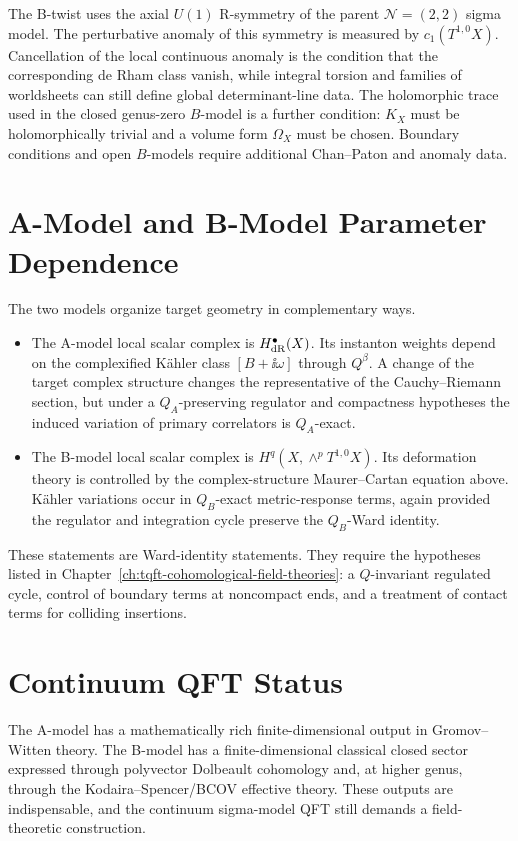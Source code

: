 The B-twist uses the axial \(U(1)\) R-symmetry of the parent
\(\mathcal N=(2,2)\) sigma model.  The perturbative anomaly of this symmetry
is measured by \(c_1(T^{1,0}X)\).  Cancellation of the local continuous
anomaly is the condition that the corresponding de Rham class vanish, while
integral torsion and families of worldsheets can still define global
determinant-line data.  The holomorphic trace used in the closed genus-zero
\(B\)-model is a further condition: \(K_X\) must be holomorphically trivial
and a volume form \(\Omega_X\) must be chosen.  Boundary conditions and open
\(B\)-models require additional Chan--Paton and anomaly data.

\section{A-Model and B-Model Parameter Dependence}

The two models organize target geometry in complementary ways.

\begin{itemize}
\item The A-model local scalar complex is \(H^\bullet_{\rm dR}(X)\).  Its
  instanton weights depend on the complexified K\"ahler class
  \([B+\ii\omega]\) through \(Q^\beta\).  A change of the target complex
  structure changes the representative of the Cauchy--Riemann section, but
  under a \(Q_A\)-preserving regulator and compactness hypotheses the induced
  variation of primary correlators is \(Q_A\)-exact.
\item The B-model local scalar complex is
  \(H^q(X,\wedge^pT^{1,0}X)\).  Its deformation theory is controlled by the
  complex-structure Maurer--Cartan equation above.  K\"ahler variations occur
  in \(Q_B\)-exact metric-response terms, again provided the regulator and
  integration cycle preserve the \(Q_B\)-Ward identity.
\end{itemize}

These statements are Ward-identity statements.  They require the hypotheses
listed in Chapter~\ref{ch:tqft-cohomological-field-theories}: a
\(Q\)-invariant regulated cycle, control of boundary terms at noncompact
ends, and a treatment of contact terms for colliding insertions.

\section{Continuum QFT Status}

The A-model has a mathematically rich finite-dimensional output in
Gromov--Witten theory.  The B-model has a finite-dimensional classical closed
sector expressed through polyvector Dolbeault cohomology and, at higher
genus, through the Kodaira--Spencer/BCOV effective theory.  These
outputs are indispensable, and the continuum sigma-model QFT still demands a
field-theoretic construction.

